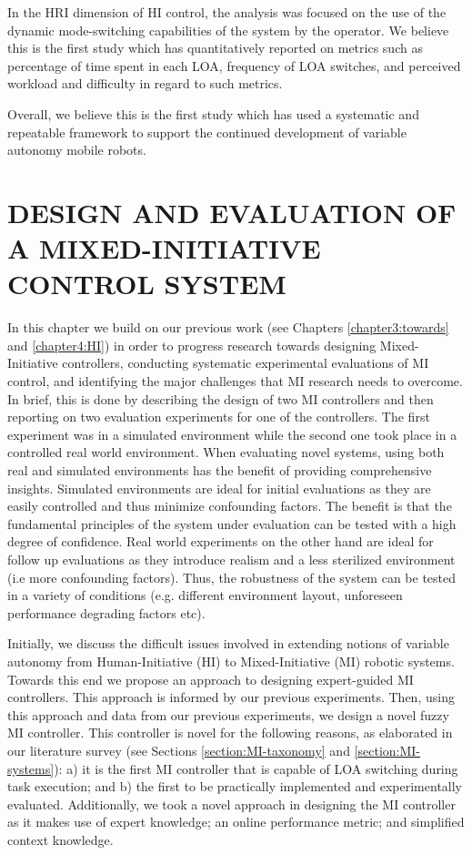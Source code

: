 \documentclass[a4paper,12pt,oneside,openright]{bhamthesis}
\begin{document}
In the HRI dimension of HI control, the analysis was focused on the use of the dynamic mode-switching capabilities of the system by the operator. We believe this is the first study which has quantitatively reported on metrics such as percentage of time spent in each LOA, frequency of LOA switches, and perceived workload and difficulty in regard to such metrics. 

Overall, we believe this is the first study which has used a systematic and repeatable framework to support the continued development of variable autonomy mobile robots. 


\chapter{DESIGN AND EVALUATION OF A MIXED-INITIATIVE CONTROL SYSTEM}
\label{chapter5:MI}
In this chapter we build on our previous work (see Chapters \ref{chapter3:towards} and \ref{chapter4:HI}) in order to progress research towards designing Mixed-Initiative controllers, conducting systematic experimental evaluations of MI control, and identifying the major challenges that MI research needs to overcome. In brief, this is done by describing the design of two MI controllers and then reporting on two evaluation experiments for one of the controllers. The first experiment was in a simulated environment while the second one took place in a controlled real world environment. When evaluating novel systems, using both real and simulated environments has the benefit of providing comprehensive insights. Simulated environments are ideal for initial evaluations as they are easily controlled and thus minimize confounding factors. The benefit is that the fundamental principles of the system under evaluation can be tested with a high degree of confidence. Real world experiments on the other hand are ideal for follow up evaluations as they introduce realism and a less sterilized environment (i.e more confounding factors). Thus, the robustness of the system can be tested in a variety of conditions (e.g. different environment layout, unforeseen performance degrading factors etc).

Initially, we discuss the difficult issues involved in extending notions of variable autonomy from Human-Initiative (HI) to Mixed-Initiative (MI) robotic systems. Towards this end we propose an approach to designing expert-guided MI controllers. This approach is informed by our previous experiments. Then, using this approach and data from our previous experiments, we design a novel fuzzy MI controller. This controller is novel for the following reasons, as elaborated in our literature survey (see Sections \ref{section:MI-taxonomy} and \ref{section:MI-systems}): a) it is the first MI controller that is capable of LOA switching during task execution; and b) the first to be practically implemented and experimentally evaluated. Additionally, we took a novel approach in designing the MI controller as it makes use of expert knowledge; an online performance metric; and simplified context knowledge. 
\end{document}

